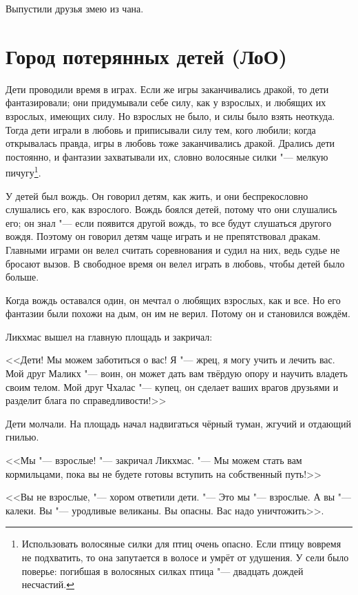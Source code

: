 Выпустили друзья змею из чана.

\section{Город потерянных детей (ЛоО)}

Дети проводили время в играх.
Если же игры заканчивались дракой, то дети фантазировали;
они придумывали себе силу, как у взрослых, и любящих их взрослых, имеющих силу.
Но взрослых не было, и силы было взять неоткуда.
Тогда дети играли в любовь и приписывали силу тем, кого любили;
когда открывалась правда, игры в любовь тоже заканчивались дракой.
Дрались дети постоянно, и фантазии захватывали их, словно волосяные силки "--- мелкую пичугу\footnote
{Использовать волосяные силки для птиц очень опасно.
Если птицу вовремя не подхватить, то она запутается в волосе и умрёт от удушения.
У сели было поверье: погибшая в волосяных силках птица "--- двадцать дождей несчастий. \authornote}.

У детей был вождь.
Он говорил детям, как жить, и они беспрекословно слушались его, как взрослого.
Вождь боялся детей, потому что они слушались его;
он знал "--- если появится другой вождь, то все будут слушаться другого вождя.
Поэтому он говорил детям чаще играть и не препятствовал дракам.
Главными играми он велел считать соревнования и судил на них, ведь судье не бросают вызов.
В свободное время он велел играть в любовь, чтобы детей было больше.

Когда вождь оставался один, он мечтал о любящих взрослых, как и все.
Но его фантазии были похожи на дым, он им не верил.
Потому он и становился вождём.

\spacing

Ликхмас вышел на главную площадь и закричал:

<<Дети!
Мы можем заботиться о вас!
Я "--- жрец, я могу учить и лечить вас.
Мой друг Маликх "--- воин, он может дать вам твёрдую опору и научить владеть своим телом.
Мой друг Чхалас "--- купец, он сделает ваших врагов друзьями и разделит блага по справедливости!>>

Дети молчали.
На площадь начал надвигаться чёрный туман, жгучий и отдающий гнилью.

<<Мы "--- взрослые! "--- закричал Ликхмас.
"--- Мы можем стать вам кормильцами, пока вы не будете готовы вступить на собственный путь!>>

<<Вы не взрослые, "--- хором ответили дети.
"--- Это мы "--- взрослые.
А вы "--- калеки.
Вы "--- уродливые великаны.
Вы опасны.
Вас надо уничтожить>>.

